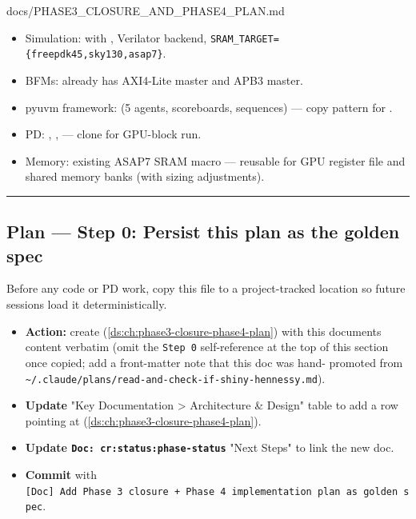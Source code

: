 \begin{relocated}{docs/PHASE3_CLOSURE_AND_PHASE4_PLAN.md}
\begin{itemize}
\tightlist
\item
  Simulation:  with
  , Verilator backend,
  \texttt{SRAM\_\allowbreak{}TARGET=\allowbreak{}\{freepdk45,\allowbreak{}sky130,\allowbreak{}asap7\}}.
\item
  BFMs:  already has AXI4-Lite master and APB3
  master.
\item
  pyuvm framework:  (5 agents, scoreboards, sequences)
  --- copy pattern for .
\item
  PD: ,
  ,
   --- clone for GPU-block run.
\item
  Memory: existing ASAP7 SRAM macro
   --- reusable for GPU
  register file and shared memory banks (with sizing adjustments).
\end{itemize}

\begin{center}\rule{0.5\linewidth}{0.5pt}\end{center}

\subsection{Plan --- Step 0: Persist this plan as the golden spec}\label{ds:ch:phase3-closure-phase4-plan:3-plan-step-0-persist-this-plan-as-the-golden-spec}

Before any code or PD work, copy this file to a project-tracked location
so future sessions load it deterministically.

\begin{itemize}
\tightlist
\item
  \textbf{Action:} create  (\cref{ds:ch:phase3-closure-phase4-plan})
  with this document\textquotesingle s content verbatim (omit the
  \texttt{Step\ 0} self-reference at the top of this section once
  copied; add a front-matter note that this doc was hand- promoted from
  \texttt{\textasciitilde{}/\allowbreak{}.\allowbreak{}claude/\allowbreak{}plans/\allowbreak{}read-\allowbreak{}and-\allowbreak{}check-\allowbreak{}if-\allowbreak{}shiny-\allowbreak{}hennessy.\allowbreak{}md}).
\item
  \textbf{Update } "Key Documentation \textgreater{}
  Architecture \& Design" table to add a row pointing at
   (\cref{ds:ch:phase3-closure-phase4-plan}).
\item
  \textbf{Update
  \texttt{Doc:\allowbreak{}\ cr:\allowbreak{}status:\allowbreak{}phase-\allowbreak{}status}}
  "Next Steps" to link the new doc.
\item
  \textbf{Commit} with
  \texttt{[Doc]\ Add\ Phase\ 3\ closure\ +\allowbreak{}\ Phase\ 4\ implementation\ plan\ as\ golden\ spec}.
\end{itemize}


\end{relocated}
